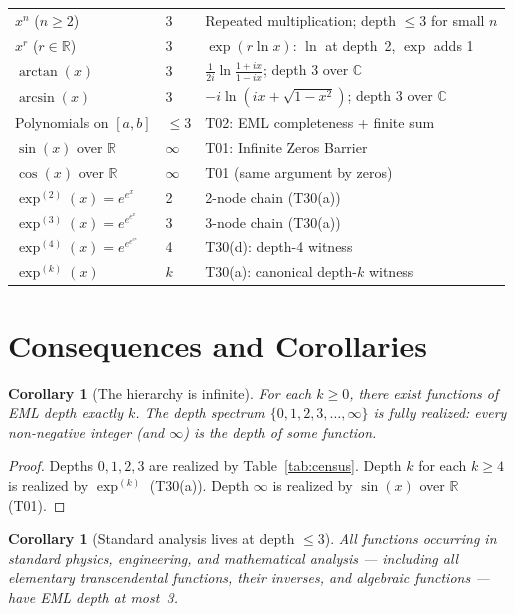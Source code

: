 \documentclass[12pt,a4paper]{article}
\newtheorem{corollary}[theorem]{Corollary}
\theoremstyle{definition}
\theoremstyle{remark}
\begin{document}
\begin{table}[ht]
\begin{tabular}{@{}llp{7cm}@{}}
$x^n$ ($n\geq 2$) & 3 & Repeated multiplication; depth $\leq 3$ for small $n$ \\
$x^r$ ($r\in\mathbb{R}$) & 3 & $\exp(r\ln x)$: $\ln$ at depth~2, $\exp$ adds 1 \\
$\arctan(x)$      & 3 & $\tfrac{1}{2i}\ln\tfrac{1+ix}{1-ix}$; depth 3 over $\mathbb{C}$ \\
$\arcsin(x)$      & 3 & $-i\ln(ix+\sqrt{1-x^2})$; depth 3 over $\mathbb{C}$ \\
Polynomials on $[a,b]$ & $\leq 3$ & T02: EML completeness + finite sum \\
\midrule
$\sin(x)$ over $\mathbb{R}$ & $\infty$ & T01: Infinite Zeros Barrier \\
$\cos(x)$ over $\mathbb{R}$ & $\infty$ & T01 (same argument by zeros) \\
\midrule
$\exp^{(2)}(x)=e^{e^x}$     & 2 & 2-node chain (T30(a)) \\
$\exp^{(3)}(x)=e^{e^{e^x}}$ & 3 & 3-node chain (T30(a)) \\
$\exp^{(4)}(x)=e^{e^{e^{e^x}}}$ & 4 & T30(d): depth-4 witness \\
$\exp^{(k)}(x)$             & $k$ & T30(a): canonical depth-$k$ witness \\
\bottomrule
\end{tabular}
\end{table}

\section{Consequences and Corollaries}

\begin{corollary}[The hierarchy is infinite]\label{cor:infinite}
For each $k\geq 0$, there exist functions of EML depth exactly $k$.
The depth spectrum $\{0,1,2,3,\ldots,\infty\}$ is fully realized: every
non-negative integer (and $\infty$) is the depth of some function.
\end{corollary}

\begin{proof}
Depths $0,1,2,3$ are realized by Table~\ref{tab:census}.
Depth $k$ for each $k\geq 4$ is realized by $\exp^{(k)}$ (T30(a)).
Depth $\infty$ is realized by $\sin(x)$ over $\mathbb{R}$ (T01).
\end{proof}

\begin{corollary}[Standard analysis lives at depth $\leq 3$]\label{cor:depth3}
All functions occurring in standard physics, engineering, and mathematical
analysis — including all elementary transcendental functions, their inverses,
and algebraic functions — have EML depth at most~3.
\end{corollary}
\end{document}
